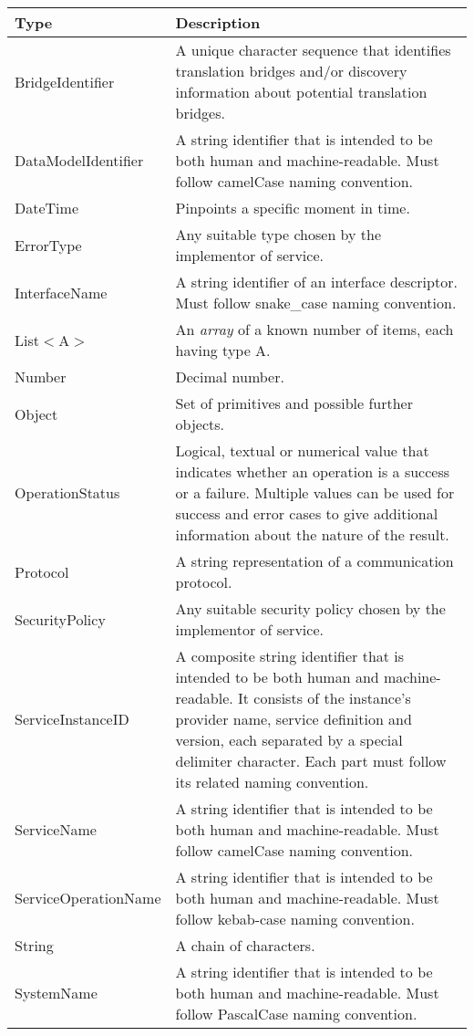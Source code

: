 \documentclass[a4paper]{arrowhead}
\newcommand{\pdef}[1]{{\textcolor{ArrowheadGrey}{#1\label{sec:model:primitives:#1}\label{sec:model:primitives:#1s}\label{sec:model:primitives:#1es}}}}
\begin{document}
\begin{table}[ht!]
\begin{tabularx}{\textwidth}{| p{5cm} | X |} \hline
\rowcolor{gray!33} Type & Description \\ \hline
\pdef{BridgeIdentifier} & A unique character sequence that identifies translation bridges and/or discovery information about potential translation bridges. \\ \hline
\pdef{DataModelIdentifier} & A string identifier that is intended to be both human and machine-readable. Must follow camelCase naming convention. \\ \hline
\pdef{DateTime}         & Pinpoints a specific moment in time. \\ \hline
\pdef{ErrorType}        & Any suitable type chosen by the implementor of service. \\ \hline
\pdef{InterfaceName}    & A string identifier of an interface descriptor. Must follow snake\_case naming convention. \\ \hline
\pdef{List}$<$A$>$      & An \textit{array} of a known number of items, each having type A. \\ \hline
\pdef{Number}           & Decimal number. \\ \hline
\pdef{Object}           & Set of primitives and possible further objects. \\ \hline
\pdef{OperationStatus}  & Logical, textual or numerical value that indicates whether an operation is a success or a failure. Multiple values can be used for success and error cases to give additional information about the nature of the result. \\ \hline
\pdef{Protocol}         & A string representation of a communication protocol. \\ \hline
\pdef{SecurityPolicy}   & Any suitable security policy chosen by the implementor of service. \\ \hline
\pdef{ServiceInstanceID} & A composite string identifier that is intended to be both human and machine-readable. It consists of the instance's provider name, service definition and version, each separated by a special delimiter character. Each part must follow its related naming convention. \\ \hline
\pdef{ServiceName}      & A string identifier that is intended to be both human and machine-readable. Must follow camelCase naming convention. \\ \hline
\pdef{ServiceOperationName} & A string identifier that is intended to be both human and machine-readable. Must follow kebab-case naming convention. \\ \hline
\pdef{String}           & A chain of characters. \\ \hline
\pdef{SystemName}       & A string identifier that is intended to be both human and machine-readable. Must follow PascalCase naming convention. \\ \hline
\end{tabularx}
\end{table}
\end{document}
